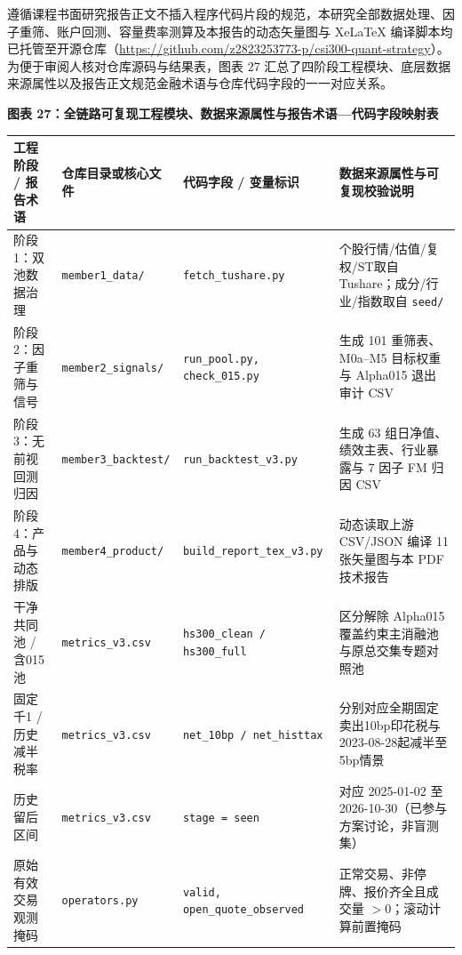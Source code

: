\documentclass[12pt,a4paper]{article}
\newcommand{\exhibitcap}[1]{{\sffamily\bfseries\fontsize{9.6pt}{12.5pt}\selectfont\textcolor{Primary}{#1}}\\[2pt]}
\begin{document}
遵循课程书面研究报告正文不插入程序代码片段的规范，本研究全部数据处理、因子重筛、账户回测、容量费率测算及本报告的动态矢量图与 XeLaTeX 编译脚本均已托管至开源仓库（\url{https://github.com/z2823253773-p/csi300-quant-strategy}）。为便于审阅人核对仓库源码与结果表，图表 27 汇总了四阶段工程模块、底层数据来源属性以及报告正文规范金融术语与仓库代码字段的一一对应关系。

\vspace{4pt}
\noindent\begin{minipage}{\textwidth}
\setlength{\parindent}{0pt}\setlength{\tabcolsep}{3.6pt}
\exhibitcap{图表 27：全链路可复现工程模块、数据来源属性与报告术语—代码字段映射表}
\fontsize{7.5pt}{10.2pt}\selectfont
\begin{tabularx}{\textwidth}{@{}l l l X@{}}
  \arrayrulecolor{Primary}\toprule[1.0pt]
  \rowcolor{TblHdr}
  \textbf{\sffamily 工程阶段 / 报告术语} & \textbf{\sffamily 仓库目录或核心文件} & \textbf{\sffamily 代码字段 / 变量标识} & \textbf{\sffamily 数据来源属性与可复现校验说明} \\
  \midrule[0.5pt]
  阶段1：双池数据治理 & \texttt{member1\_data/} & \texttt{fetch\_tushare.py} & 个股行情/估值/复权/ST取自Tushare；成分/行业/指数取自 \texttt{seed/} \\
  阶段2：因子重筛与信号 & \texttt{member2\_signals/} & \texttt{run\_pool.py, check\_015.py} & 生成 101 重筛表、M0a--M5 目标权重与 Alpha015 退出审计 CSV \\
  阶段3：无前视回测归因 & \texttt{member3\_backtest/} & \texttt{run\_backtest\_v3.py} & 生成 63 组日净值、绩效主表、行业暴露与 7 因子 FM 归因 CSV \\
  阶段4：产品与动态排版 & \texttt{member4\_product/} & \texttt{build\_report\_tex\_v3.py} & 动态读取上游 CSV/JSON 编译 11 张矢量图与本 PDF 技术报告 \\
  \arrayrulecolor{RuleMuted}\midrule[0.35pt]
  干净共同池 / 含015池 & \texttt{metrics\_v3.csv} & \texttt{hs300\_clean / hs300\_full} & 区分解除 Alpha015 覆盖约束主消融池与原总交集专题对照池 \\
  固定千1 / 历史减半税率 & \texttt{metrics\_v3.csv} & \texttt{net\_10bp / net\_histtax} & 分别对应全期固定卖出10bp印花税与2023-08-28起减半至5bp情景 \\
  历史留后区间 & \texttt{metrics\_v3.csv} & \texttt{stage = seen} & 对应 2025-01-02 至 2026-10-30（已参与方案讨论，非盲测集） \\
  原始有效交易观测掩码 & \texttt{operators.py} & \texttt{valid, open\_quote\_observed} & 正常交易、非停牌、报价齐全且成交量 $>0$；滚动计算前置掩码 \\

\end{tabularx}
\end{minipage}
\end{document}
